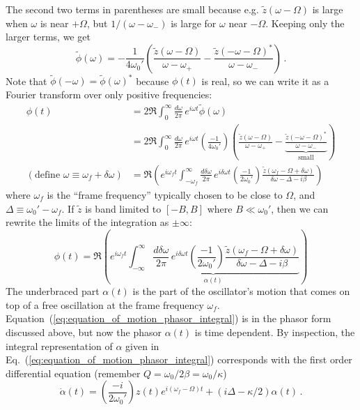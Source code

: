 The second two terms in parentheses are small because e.g. $\tilde{z}(\omega - \Omega)$ is large when $\omega$ is near $+\Omega$, but $1 / (\omega - \omega_-)$ is large for $\omega$ near $-\Omega$.
Keeping only the larger terms, we get
\begin{equation}
  \tilde{\phi}(\omega) =
  - \frac{1}{4 \omega_0'}
  \left(
      \frac{\tilde{z}(\omega - \Omega)}{\omega - \omega_+}
    - \frac{\tilde{z}(-\omega - \Omega)^*}{\omega - \omega_-}
  \right) \, .
\end{equation}
Note that $\tilde{\phi}(-\omega) = \tilde{\phi}(\omega)^*$ because $\phi(t)$ is real, so we can write it as a Fourier transform over only positive frequencies:
\begin{align*}
  \phi(t)
  &= 2 \Re \int_0^\infty \frac{d\omega}{2\pi} \, e^{i \omega t} \tilde{\phi}(\omega) \\
  &= 2 \Re \int_0^\infty \frac{d\omega}{2\pi} \, e^{i \omega t} \left( \frac{-1}{4 \omega_0'} \right)
    \left(
      \frac{\tilde{z}(\omega - \Omega)}{\omega - \omega_+}
      - \underbrace{\frac{\tilde{z}(-\omega - \Omega)^*}{\omega - \omega_-}}_\text{small}
    \right) \\
  (\text{define } \omega \equiv \omega_f + \delta \omega)
  &= \Re
  \left(
    e^{i \omega_f t}
    \int_{-\omega_f}^\infty \frac{d \delta \omega}{2\pi} \,
    e^{i \delta \omega t}
    \left( \frac{-1}{2 \omega_0'} \right)
    \frac{\tilde{z}(\omega_f - \Omega + \delta \omega)}{\delta \omega - \Delta - i \beta}
  \right)
\end{align*}
where $\omega_f$ is the ``frame frequency'' typically chosen to be close to $\Omega$, and $\Delta \equiv \omega_0' - \omega_f$.
If $\tilde{z}$ is band limited to $[-B, B]$ where $B \ll \omega_0'$, then we can rewrite the limits of the integration as $\pm \infty$:
\begin{equation}
  \phi(t) = \Re
  \left(
    e^{i \omega_f t}
    \underbrace{
      \int_{-\infty}^\infty \frac{d \delta \omega}{2\pi} \,
      e^{i \delta \omega t}
      \left( \frac{-1}{2 \omega_0'} \right)
      \frac{\tilde{z}(\omega_f - \Omega + \delta \omega)}{\delta \omega - \Delta - i \beta}
    }_{\alpha(t)}
  \right)
  \label{eq:equation_of_motion_phasor_integral}
\end{equation}
The underbraced part $\alpha(t)$ is the part of the oscillator's motion that comes on top of a free oscillation at the frame frequency $\omega_f$.
Equation~(\ref{eq:equation_of_motion_phasor_integral}) is in the phasor form discussed above, but now the phasor $\alpha(t)$ is time dependent.
By inspection, the integral representation of $\alpha$ given in Eq.~(\ref{eq:equation_of_motion_phasor_integral}) corresponds with the first order differential equation (remember $Q = \omega_0 / 2 \beta = \omega_0 / \kappa$)
\begin{equation}
  \dot{\alpha}(t) = \left(\frac{-i}{2 \omega_0'}\right) z(t) e^{i (\omega_f - \Omega) t} + (i \Delta - \kappa/2) \alpha(t)
  \, .
  \label{eq:equation_of_motion_phasor}  %
\end{equation}
